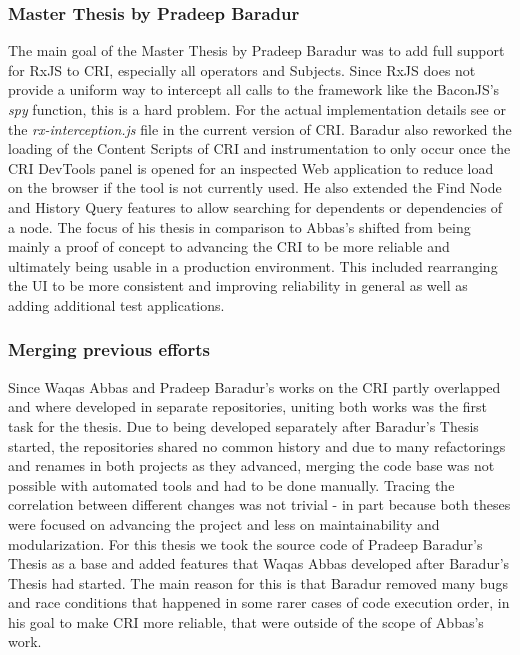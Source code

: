 	\subsubsection{Master Thesis by Pradeep Baradur}
	 \cite{ThesisBaradur} The main goal of the Master Thesis by Pradeep Baradur was to add full support for RxJS to CRI, especially all operators and Subjects. Since RxJS does not provide a uniform way to intercept all calls to the framework like the BaconJS's \emph{spy} function, this is a hard problem. For the actual implementation details see \cite{ThesisBaradur} or the \emph{rx-interception.js} file in the current version of CRI. Baradur also reworked the loading of the Content Scripts of CRI and instrumentation to only occur once the CRI DevTools panel is opened for an inspected Web application to reduce load on the browser if the tool is not currently used. He also extended the Find Node and History Query features to allow searching for dependents or dependencies of a node. The focus of his thesis in comparison to Abbas's shifted from being mainly a proof of concept to advancing the CRI to be more reliable and ultimately being usable in a production environment. This included rearranging the UI to be more consistent and improving reliability in general as well as adding additional test applications.
		
	\subsubsection{Merging previous efforts}
	Since Waqas Abbas and Pradeep Baradur's works on the CRI partly overlapped and where developed in separate repositories, uniting both works was the first task for the thesis. Due to being developed separately after Baradur's Thesis started, the repositories shared no common history and due to many refactorings and renames in both projects as they advanced, merging the code base was not possible with automated tools and had to be done manually. Tracing the correlation between different changes was not trivial - in part because both theses were focused on advancing the project and less on maintainability and modularization. For this thesis we took the source code of Pradeep Baradur's Thesis as a base and added features that Waqas Abbas developed after Baradur's Thesis had started. The main reason for this is that Baradur removed many bugs and race conditions that happened in some rarer cases of code execution order, in his goal to make CRI more reliable, that were outside of the scope of Abbas's work.
		
